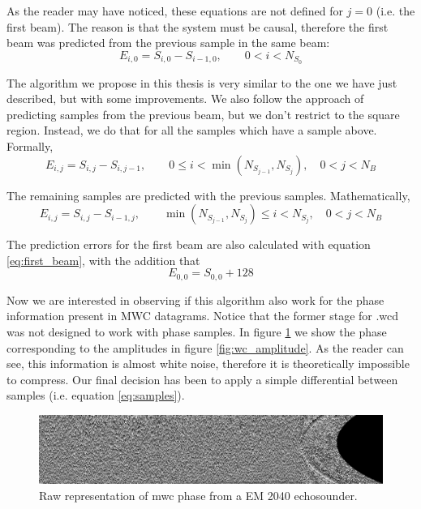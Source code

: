 As the reader may have noticed, these equations are not defined for $j=0$ (i.e. the first beam). The reason is that the system must be causal, therefore the first beam was predicted from the previous sample in the same beam:
\begin{equation} \label{eq:first_beam}
E_{i,0} = S_{i,0} - S_{i-1,0}, \qquad 0 < i < N_{S_0}
\end{equation}

The algorithm we propose in this thesis is very similar to the one we have just described, but with some improvements. We also follow the approach of predicting samples from the previous beam, but we don't restrict to the square region. Instead, we do that for all the samples which have a sample above. Formally,
\begin{equation}
E_{i,j} = S_{i,j} - S_{i,j-1}, \qquad 0 \leq i < \min(N_{S_{j-1}}, N_{S_j}), \quad 0 < j < N_B
\end{equation}

The remaining samples are predicted with the previous samples. Mathematically,
\begin{equation} \label{eq:samples}
E_{i,j} = S_{i,j} - S_{i-1,j}, \qquad \min(N_{S_{j-1}}, N_{S_j}) \leq i < N_{S_j}, \quad 0 < j < N_B
\end{equation}

The prediction errors for the first beam are also calculated with equation \ref{eq:first_beam}, with the addition that
\begin{equation}
E_{0,0} = S_{0,0} + 128
\end{equation}

Now we are interested in observing if this algorithm also work for the phase information present in MWC datagrams. Notice that the former stage for .wcd was not designed to work with phase samples. In figure \ref{fig:wc_phase} we show the phase corresponding to the amplitudes in figure \ref{fig:wc_amplitude}. As the reader can see, this information is almost white noise, therefore it is theoretically impossible to compress. Our final decision has been to apply a simple differential between samples (i.e. equation \ref{eq:samples}).
\begin{figure}[h!]
	\begin{center}
		\includegraphics[scale=0.334]{images/water_column_ph.png}
	\end{center}
	\caption{Raw representation of \acrshort{mwc} phase from a EM 2040 echosounder.}
	\label{fig:wc_phase}
\end{figure}

